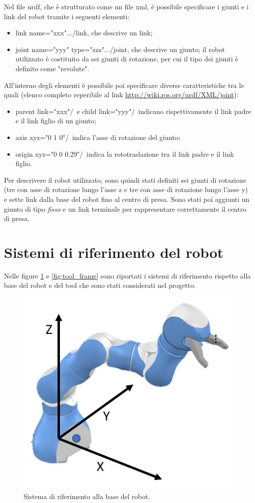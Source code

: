 Nel file urdf, che è strutturato come un file xml, è possibile specificare i giunti e i link del robot tramite i seguenti elementi:
\begin{itemize}
	\item \tl link name="xxx"\tr...\tl /link\tr, che descrive un link;
	\item \tl joint name="yyy" type="zzz"\tr...\tl /joint\tr, che descrive un giunto; il robot utilizzato è costituito da sei giunti di rotazione, per cui il tipo dei giunti è definito come "revolute".
\end{itemize}
All'interno degli elementi è possibile poi specificare diverse caratteristiche tra le quali (elenco completo reperibile al link \url{http://wiki.ros.org/urdf/XML/joint}):
\begin{itemize}
	\item  \tl parent link="xxx"/\tr\ e \tl child link="yyy"/\tr\ indicano rispettivamente il link padre e il link figlio di un giunto;
	\item \tl axis xyz="0 1 0"/\tr\ indica l'asse di rotazione del giunto;
	\item  \tl origin xyz="0 0 0.29"/\tr\ indica la rototraslazione tra il link padre e il link figlio.
\end{itemize}
Per descrivere il robot utilizzato, sono quindi stati definiti sei giunti di rotazione (tre con asse di rotazione lungo l'asse z e tre con asse di rotazione lungo l'asse y) e sette link dalla base del robot fino al centro di presa. Sono stati poi aggiunti un giunto di tipo \textit{fisso} e un link terminale per rappresentare correttamente il centro di presa.

\clearpage


\section{Sistemi di riferimento del robot}

Nelle figure \ref{fig:base_frame} e \ref{fig:tool_frame} sono riportati i sistemi di riferimento rispetto alla base del robot e del tool che sono stati considerati nel progetto.

\begin{figure}[tbh]
	\centering
	\includegraphics[width=0.5\linewidth]{./ImageFiles/prob_frame_base}
	\caption{Sistema di riferimento alla base del robot.}
	\label{fig:base_frame}
\end{figure}

